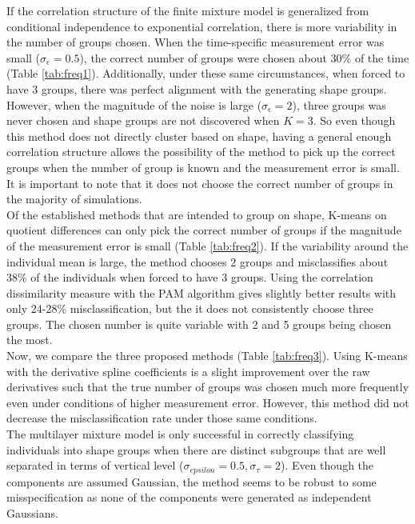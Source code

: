 \documentclass[12pt]{article}
\begin{document}
If the correlation structure of the finite mixture model is generalized from conditional independence to exponential correlation, there is more variability in the number of groups chosen. When the time-specific measurement error was small ($\sigma_{\epsilon}=0.5$), the correct number of groups were chosen about 30\% of the time (Table \ref{tab:freq1}). Additionally, under these same circumstances, when forced to have 3 groups, there was perfect alignment with the generating shape groups. However, when the magnitude of the noise is large ($\sigma_{\epsilon}=2$), three groups was never chosen and shape groups are not discovered when $K=3$. So even though this method does not directly cluster based on shape, having a general enough correlation structure allows  the possibility of the method to pick up the correct groups when the number of group is known and the measurement error is small. It is important to note that it does not choose the correct number of groups in the majority of simulations. \\

Of the established methods that are intended to group on shape, K-means on quotient differences can only pick the correct number of groups if the magnitude of the measurement error is small (Table \ref{tab:freq2}). If the variability around the individual mean is large, the method chooses 2 groups and misclassifies about 38\% of the individuals when forced to have 3 groups. Using the correlation dissimilarity measure with the PAM algorithm gives slightly better results with only 24-28\% misclassification, but the it does not consistently choose three groups. The chosen number is quite variable with 2 and 5 groups being chosen the most.\\

Now, we compare the three proposed methods (Table \ref{tab:freq3}). Using K-means with the derivative spline coefficients is a slight improvement over the raw derivatives such that the true number of groups was chosen much more frequently even under conditions of higher measurement error. However, this method did not decrease the misclassification rate under those same conditions. \\

The multilayer mixture model is only successful in correctly classifying individuals into shape groups when there are distinct subgroups that are well separated in terms of vertical level ($\sigma_{epsilon}=0.5, \sigma_{\tau}=2$). Even though the components are assumed Gaussian, the method seems to be robust to some misspecification as none of the components were generated as independent Gaussians. \\
\end{document}

